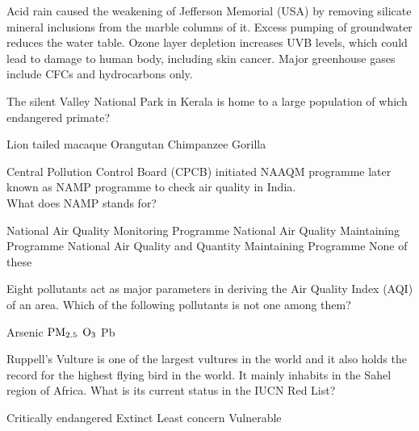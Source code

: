 \begin{questions}
    \begin{randomizechoices}
        \choice Acid rain caused the weakening of Jefferson Memorial (USA) by removing silicate mineral inclusions from the marble columns of it.
        \choice Excess pumping of groundwater reduces the water table.
        \choice Ozone layer depletion increases UVB levels, which could lead to damage to human body, including skin cancer.
        \CorrectChoice Major greenhouse gases include CFCs and hydrocarbons only.
    \end{randomizechoices}

    \question The silent Valley National Park in Kerala is home to a large population of which endangered primate?

    \begin{randomizeoneparchoices}
        \CorrectChoice Lion tailed macaque
        \choice Orangutan
        \choice Chimpanzee
        \choice Gorilla
    \end{randomizeoneparchoices}

    \question Central Pollution Control Board (CPCB) initiated NAAQM programme later known as NAMP programme to check air quality in India. \\ What does NAMP stands for?

    \begin{randomizechoices}
        \CorrectChoice National Air Quality Monitoring Programme
        \choice National Air Quality Maintaining Programme
        \choice National Air Quality and Quantity Maintaining Programme
        \choice None of these
    \end{randomizechoices}

    \question Eight pollutants act as major parameters in deriving the Air Quality Index (AQI) of an area. Which of the following pollutants is not one among them?

    \begin{randomizeoneparchoices}
        \CorrectChoice Arsenic
        \choice \(\textnormal{PM}_{2.5}\)
        \choice \(\textnormal{O}_3\)
        \choice Pb
    \end{randomizeoneparchoices}

    \question Ruppell's Vulture is one of the largest vultures in the world and it also holds the record for the highest flying bird in the world. It mainly inhabits in the Sahel region of Africa. What is its current status in the IUCN Red List?

    \begin{randomizeoneparchoices}
        \CorrectChoice Critically endangered
        \choice Extinct
        \choice Least concern
        \choice Vulnerable
    \end{randomizeoneparchoices}


\end{questions}
